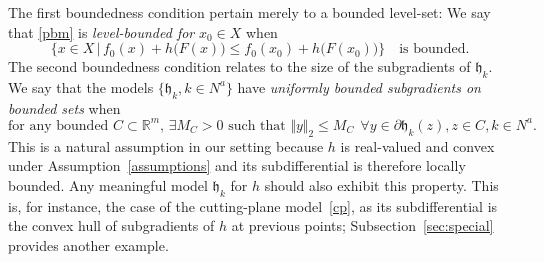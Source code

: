 \documentclass[smallextended,envcountsect]{svjour3}
\newcommand{\norm}[1]{\textstyle{\Vert} #1 \textstyle{\Vert}_2}
\newcommand{\col}[1]{\left\{#1\right\}}
\newcommand{\tol}{\texttt{Tol}}
\renewcommand{\Re}{\mathbb{R}}
\newcommand{\modelh}{\mathfrak{h}}
\newcommand{\nats}{\mathbb{N}}
\newcommand{\reals}{\mathbb{R}}
\newcommand{\nliminf}{\mathop{\rm liminf}\nolimits}
\DeclareMathOperator{\dist}{dist}
\begin{document}
The first boundedness condition pertain merely to a bounded level-set: 
We say that \eqref{pbm} is {\em level-bounded for} $x_0\in X$ when 
\[
\Big\{x \in X\,\Big|\, f_0(x) +h\big(F(x)\big)\leq  f_0(x_0) + h\big(F(x_0)\big)\Big\} ~~~\text{ is bounded}.
\]
The second boundedness condition relates to the size of the subgradients of $\modelh_k$. We say that the models $\{\modelh_k, k\in N^a\}$ have {\em uniformly bounded subgradients on bounded sets} when 
\begin{equation}\label{uniform_bound}
    \mbox{for any bounded $C \subset \Re^m$, $\exists M_C>0$ such that } \norm{y}\leq M_C ~~\forall y\in \partial \modelh_k(z), z\in C, k \in N^a.
\end{equation}
This is a natural assumption in our setting because \( h \) is real-valued and convex under Assumption~\ref{assumptions} and its subdifferential is therefore locally bounded. Any meaningful model $\modelh_k$ for $h$ should also exhibit this property. This is, for instance, the case of the cutting-plane model~\eqref{cp}, as its subdifferential is the convex hull of subgradients of $ h$ at previous points; Subsection~\ref{sec:special} provides another example.


%
\end{document}
